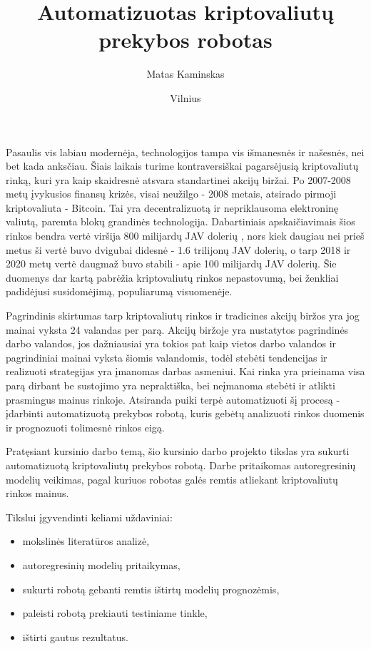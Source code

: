 \documentclass{VUMIFInfKursinis}
\institute{Informatikos institutas}  %
\title{Automatizuotas kriptovaliutų prekybos robotas}
\author{Matas Kaminskas}
\date{Vilnius \\ \the\year}
\begin{document}
\maketitle

\tableofcontents

Pasaulis vis labiau modernėja, technologijos tampa vis išmanesnės ir našesnės, nei bet kada anksčiau. Šiais laikais turime kontraversiškai pagarsėjusią
kriptovaliutų rinką, kuri yra kaip skaidresnė atsvara standartinei akcijų biržai. Po 2007-2008 metų įvykusios finansų krizės,
visai neužilgo - \cite{nakamoto2008bitcoin} 2008 metais, atsirado pirmoji kriptovaliuta - Bitcoin. Tai yra decentralizuotą ir nepriklausoma elektroninę valiutą, paremta
blokų grandinės technologija. Dabartiniais apskaičiavimais šios rinkos bendra vertė viršija 800 milijardų JAV dolerių \cite{CoinMarketCap},
nors kiek daugiau nei prieš metus ši vertė buvo dvigubai didesnė - 1.6 trilijonų JAV dolerių, o tarp 2018 ir 2020 metų vertė daugmaž buvo stabili - apie 100 milijardų JAV dolerių.
Šie duomenys dar kartą pabrėžia kriptovaliutų rinkos nepastovumą, bei ženkliai padidėjusi susidomėjimą, populiarumą visuomenėje.    


Pagrindinis skirtumas tarp kriptovaliutų rinkos ir tradicines akcijų biržos yra jog mainai vyksta 24 valandas per parą. Akcijų biržoje yra nustatytos pagrindinės darbo valandos,
jos dažniausiai yra tokios pat kaip vietos darbo valandos ir pagrindiniai mainai vyksta šiomis valandomis, todėl stebėti tendencijas ir realizuoti strategijas yra įmanomas darbas asmeniui.
Kai rinka yra prieinama visa parą dirbant be sustojimo yra nepraktiška, bei neįmanoma stebėti ir atlikti prasmingus mainus rinkoje. Atsiranda puiki terpė automatizuoti šį 
procesą - įdarbinti automatizuotą prekybos robotą, kuris gebėtų analizuoti rinkos duomenis ir prognozuoti tolimesnė rinkos eigą.


Pratęsiant kursinio darbo temą, šio kursinio darbo projekto tikslas yra sukurti automatizuotą kriptovaliutų prekybos robotą. 
Darbe pritaikomas autoregresinių modelių veikimas, pagal kuriuos robotas galės remtis atliekant kriptovaliutų rinkos mainus. 

Tikslui įgyvendinti keliami uždaviniai:
\begin{itemize}
  \item mokslinės literatūros analizė,
  \item autoregresinių modelių pritaikymas,
  \item sukurti robotą gebanti remtis ištirtų modelių prognozėmis,
  \item paleisti robotą prekiauti testiniame tinkle,
  \item ištirti gautus rezultatus.
\end{itemize}
\end{document}
